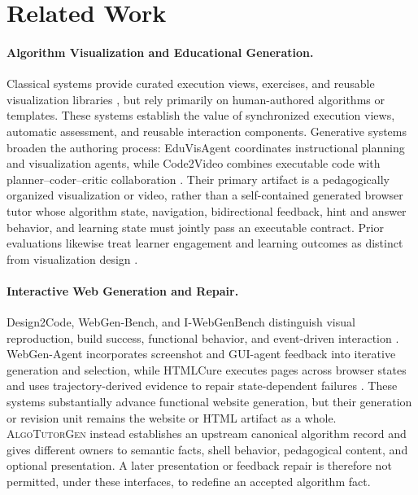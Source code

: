 \documentclass[letterpaper]{article}
\newcommand{\system}{\textsc{AlgoTutorGen}}
\begin{document}
\section{Related Work}
\label{sec:related_work}

\paragraph{Algorithm Visualization and Educational Generation.}
Classical systems provide curated execution views, exercises, and
reusable visualization libraries
\citep{Malmi2004TRAKLA2,Guo2013PythonTutor,
Karavirta2013JSAV,Shaffer2011OpenDSA,Halim2015VisuAlgo,Naps2005JHAVE},
but rely primarily on human-authored algorithms or templates.
These systems establish the value of synchronized execution views,
automatic assessment, and reusable interaction components. Generative
systems broaden the authoring process: EduVisAgent coordinates
instructional planning and visualization agents, while Code2Video
combines executable code with planner--coder--critic collaboration
\citep{ji2025eduvisagent,chen2025code2video}. Their primary artifact is
a pedagogically organized visualization or video, rather than a
self-contained generated browser tutor whose algorithm state,
navigation, bidirectional feedback, hint and answer behavior, and
learning state must jointly pass an executable contract. Prior
evaluations likewise treat learner engagement and learning outcomes as
distinct from visualization design
\citep{Naps2003Engagement,Hundhausen2002MetaStudy}.

\paragraph{Interactive Web Generation and Repair.}
Design2Code, WebGen-Bench, and I-WebGenBench distinguish visual
reproduction, build success, functional behavior, and event-driven
interaction
\citep{si2025design2code,lu2025webgenbench,dai2026iwebgenbench}.
WebGen-Agent incorporates screenshot and GUI-agent feedback into
iterative generation and selection, while HTMLCure executes pages
across browser states and uses trajectory-derived evidence to repair
state-dependent failures
\citep{lu2025webgenagent,wu2026htmlcure}. These systems substantially
advance functional website generation, but their generation or
revision unit remains the website or HTML artifact as a whole.
\system{} instead establishes an upstream canonical algorithm record
and gives different owners to semantic facts, shell behavior,
pedagogical content, and optional presentation. A later presentation
or feedback repair is therefore not permitted, under these interfaces,
to redefine an accepted algorithm fact.
\end{document}
